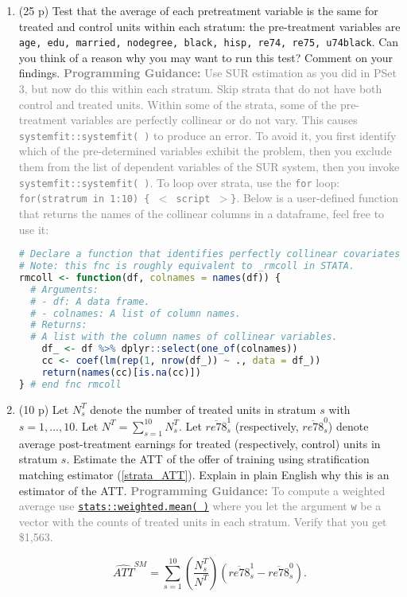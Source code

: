 \documentclass{article}
\begin{document}
\begin{enumerate}[label=\textbf{Q\arabic{enumi}}.,ref=Q\arabic{enumi}, wide=0pt, itemsep=0em, topsep=5pt, labelindent=0pt]
\begin{enumerate}
\item (25 p) Test that the average of each pretreatment variable is the same for treated and control units within each stratum: the pre-treatment variables are \texttt{age, edu, married, nodegree, black, hisp, re74, re75, u74black}. Can you think of a reason why you may want to run this test? Comment on your findings. \textcolor{gray}{\textbf{Programming Guidance:} Use SUR estimation as you did in PSet 3, but now do this within each stratum. Skip strata that do not have both control and treated units. Within some of the strata, some of the pre-treatment variables are perfectly collinear or do not vary. This causes \texttt{systemfit::systemfit( )} to produce an error. To avoid it, you first identify which of the pre-determined variables exhibit the problem, then you exclude them from the list of dependent variables of the SUR system, then you invoke \texttt{systemfit::systemfit( )}. To loop over strata, use the \texttt{for} loop: \texttt{for(stratrum in 1:10) \{ $<$ script $>$\}}. Below is a user-defined function that returns the names of the collinear columns in a dataframe, feel free to use it:}

\begin{lstlisting}[language=R]
# Declare a function that identifies perfectly collinear covariates.
# Note: this fnc is roughly equivalent to _rmcoll in STATA.
rmcoll <- function(df, colnames = names(df)) {
  # Arguments:
  # - df: A data frame.
  # - colnames: A list of column names.
  # Returns:
  # A list with the column names of collinear variables.
 	df_ <- df %>% dplyr::select(one_of(colnames))
 	cc <- coef(lm(rep(1, nrow(df_)) ~ ., data = df_))
  	return(names(cc)[is.na(cc)])
} # end fnc rmcoll
\end{lstlisting}

\item (10 p) Let $N_{s}^{T}$ denote the number of treated units in stratum $s$ with $s=1,...,10$. Let $N^{T}=\sum_{s=1}^{10}N_{s}^{T}$. Let $\overline{re78}_{s}^{1}$ (respectively, $\overline{re78}_{s}^{0}$) denote average post-treatment earnings for treated (respectively, control) units in stratum $s$. Estimate the ATT of the offer of training using stratification matching estimator (\ref{strata_ATT}). Explain in plain English why this is an estimator of the ATT. \textcolor{gray}{\textbf{Programming Guidance:} To compute a weighted average use \href{https://www.rdocumentation.org/packages/stats/versions/3.6.2/topics/weighted.mean}{\texttt{stats::weighted.mean( )}} where you let the argument \texttt{w} be a vector with the counts of treated units in each stratum. Verify that you get \$1,563.}\label{item:naive-ATT-estimate}

\begin{equation}
\widehat{ATT}^{SM}=\sum_{s=1}^{10}\left( \frac{N_{s}^{T}}{N^{T}}\right) \left( \overline{re78}_{s}^{1}-\overline{re78}_{s}^{0}\right) 
\text{.}  \label{strata_ATT}
\end{equation}
\end{enumerate}
\end{enumerate}
\end{document}
